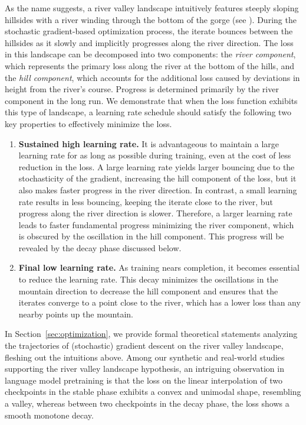 As the name suggests, a river valley landscape intuitively features steeply sloping hillsides with a river winding through the bottom of the gorge (see ). During the stochastic gradient-based optimization process, the iterate bounces between the hillsides as it slowly and implicitly progresses along the river direction. The loss in this landscape can be decomposed into two components: the \emph{river component}, which represents the primary loss along the river at the bottom of the hills, and the \emph{hill component}, which accounts for the additional loss caused by deviations in height from the river's course. Progress is determined primarily by the river component in the long run.
We demonstrate that when the loss function exhibits this type of landscape, a learning rate schedule should satisfy the following two key properties to effectively minimize the loss.
\vspace{-0.1in}
\begin{enumerate}[leftmargin=*]
\setlength{\itemsep}{0pt}
    \item \textbf{Sustained high learning rate.} It is advantageous to maintain a large learning rate for as long as possible during training, even at the cost of less reduction in the loss. A large learning rate yields larger  bouncing due to the stochasticity of the gradient, increasing the hill component of the loss, but it also makes faster progress in the river direction. In contrast, a small learning rate results in less bouncing, keeping the iterate close to the river, but progress along the river direction is slower. Therefore, a larger learning rate leads to faster fundamental progress minimizing the river component, which is obscured by the oscillation in the hill component. This progress will be revealed by the decay phase discussed below.
    \item \textbf{Final low learning rate.} As training nears completion, it becomes essential to reduce the learning rate. This decay minimizes the oscillations in the mountain direction to decrease the hill component and ensures that the iterates converge to a point close to the river, which has a lower loss than any nearby points up the mountain.
\end{enumerate}
\vspace{-0.1in}
In Section~\ref{sec:optimization}, we provide formal theoretical statements analyzing the trajectories of (stochastic) gradient descent on the river valley landscape, fleshing out the intuitions above. 
Among our synthetic and real-world studies supporting the river valley landscape hypothesis, an intriguing observation in language model pretraining is that the loss on the linear interpolation of two checkpoints in the stable phase exhibits a convex and unimodal shape, resembling a valley, whereas between two checkpoints in the decay phase, the loss shows a smooth monotone decay.

